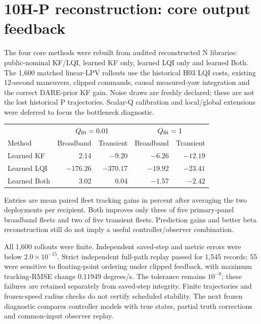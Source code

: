 \section{10H-P reconstruction: core output feedback}
The four core methods were rebuilt from audited reconstructed N libraries:
public-nominal KF/LQI, learned KF only, learned LQI only and learned Both.
The 1,600 matched linear-LPV rollouts use the historical H03 LQI costs, existing
12-second maneuvers, clipped commands, causal measured-yaw integration and the
correct DARE-prior KF gain. Noise draws are freshly declared; these are not
the lost historical P trajectories. Scalar-Q calibration and local/global
extensions were deferred to focus the bottleneck diagnostic.

\begin{center}
\begin{tabular}{lrrrr}
\hline
 & \multicolumn{2}{c}{$Q_{\rm fit}=0.01$} & \multicolumn{2}{c}{$Q_{\rm fit}=1$}\\
Method & Broadband & Transient & Broadband & Transient\\
\hline
Learned KF & 2.14 & $-9.20$ & $-6.26$ & $-12.19$\\
Learned LQI & $-176.26$ & $-370.17$ & $-19.92$ & $-23.41$\\
Learned Both & 3.02 & 0.04 & $-1.57$ & $-2.42$\\
\hline
\end{tabular}
\end{center}
Entries are mean paired fleet tracking gains in percent after averaging the
two deployments per recipient. Both improves only three of five primary-panel
broadband fleets and two of five transient fleets. Prediction gains and better
beta reconstruction still do not imply a useful controller/observer combination.

All 1,600 rollouts were finite. Independent saved-step and metric errors were
below $2.0\times10^{-15}$. Strict independent full-path replay passed for 1,545
records; 55 were sensitive to floating-point ordering under clipped feedback,
with maximum tracking-RMSE change 0.11949 degrees/s. The tolerance remains
$10^{-8}$; these failures are retained separately from saved-step integrity.
Finite trajectories and frozen-speed radius checks do not certify scheduled
stability. The next frozen diagnostic compares controller models with true
states, partial truth corrections and common-input observer replay.
